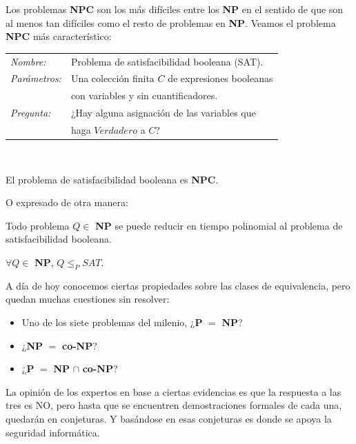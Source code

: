 \hfil

Los problemas \textbf{NPC} son los más difíciles entre los \textbf{NP} en el sentido de que son al menos tan difíciles como el resto de problemas en \textbf{NP}. Veamos el problema \textbf{NPC} más característico:

	\begin{tabular}{|ll}
		\textit{Nombre:} & Problema de satisfacibilidad booleana (SAT). \\
		\textit{Parámetros:} & Una colección finita $C$ de expresiones booleanas \\
				 &  con variables y sin cuantificadores. \\
		\textit{Pregunta:} & ¿Hay alguna asignación de las variables que \\ & haga $Verdadero$ a $C$? \\
	\end{tabular}
	\\

\begin{theorem}
	El problema de satisfacibilidad booleana es \textbf{NPC}.
\end{theorem}


O expresado de otra manera:

\begin{theorem}
	Todo problema $Q \in $ \textbf{NP} se puede reducir en tiempo polinomial al problema de satisfacibilidad booleana.
	
	$\forall Q \in $ \textbf{NP}, $Q \leq_P SAT$.
\end{theorem}


\hfil

A día de hoy conocemos ciertas propiedades sobre las clases de equivalencia, pero quedan muchas cuestiones sin resolver:

\begin{itemize}
	\item Uno de los siete problemas del milenio, ¿\textbf{P} $=$ \textbf{NP}?
	\item ¿\textbf{NP} $=$ \textbf{co-NP}?
	\item ¿\textbf{P} $=$ \textbf{NP} $\cap$ \textbf{co-NP}?
\end{itemize}


La opinión de los expertos en base a ciertas evidencias es que la respuesta a las tres es NO, pero hasta que se encuentren demostraciones formales de cada una, quedarán en conjeturas. Y basándose en esas conjeturas es donde se apoya la seguridad informática.


